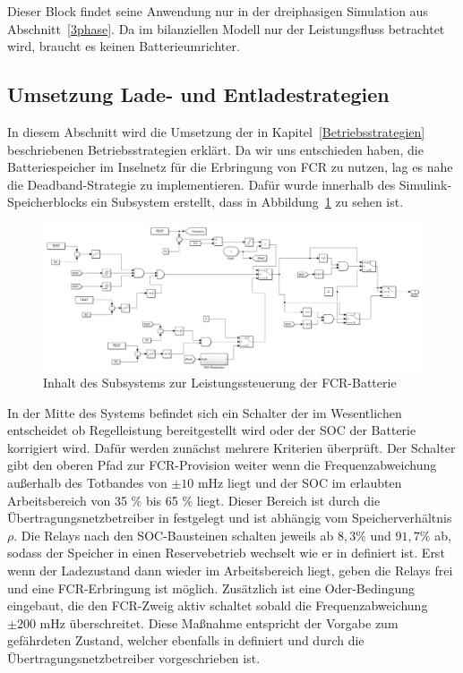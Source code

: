 Dieser Block findet seine Anwendung nur in der dreiphasigen Simulation aus Abschnitt~\ref{3phase}.
Da im bilanziellen Modell nur der Leistungsfluss betrachtet wird, braucht es keinen Batterieumrichter.

\subsection{Umsetzung Lade- und Entladestrategien}\label{Lade- und Entlade}
In diesem Abschnitt wird die Umsetzung der in Kapitel~\ref{Betriebsstrategien} beschriebenen Betriebsstrategien erklärt.
Da wir uns entschieden haben, die Batteriespeicher im Inselnetz für die Erbringung von FCR zu nutzen, lag es nahe 
die Deadband-Strategie zu implementieren.
Dafür wurde innerhalb des Simulink-Speicherblocks ein Subsystem erstellt, dass in Abbildung~\ref{Steuerung} zu sehen ist.

\begin{figure}[h!]
	\centering
	\includegraphics[width=14cm]{Abbildungen/Steuerung.png}
	\caption{Inhalt des Subsystems zur Leistungssteuerung der FCR-Batterie}\label{Steuerung}
\end{figure}

In der Mitte des Systems befindet sich ein Schalter der im Wesentlichen entscheidet ob Regelleistung bereitgestellt wird
oder der SOC der Batterie korrigiert wird.
Dafür werden zunächst mehrere Kriterien überprüft.
Der Schalter gibt den oberen Pfad zur FCR-Provision weiter wenn die Frequenzabweichung außerhalb des Totbandes von $\pm 10$ mHz liegt
und der SOC im erlaubten Arbeitsbereich von 35 \% bis 65 \% liegt.
Dieser Bereich ist durch die Übertragungsnetzbetreiber in \parencite[]{Reservebetrieb} festgelegt und ist abhängig vom Speicherverhältnis $\rho$.
Die Relays nach den SOC-Bausteinen schalten jeweils ab $8,3 \%$ und $91,7 \%$ ab, sodass der Speicher in einen Reservebetrieb wechselt wie er in \parencite[]{Reservebetrieb}
definiert ist.
Erst wenn der Ladezustand dann wieder im Arbeitsbereich liegt, geben die Relays frei und eine FCR-Erbringung ist möglich.
Zusätzlich ist eine Oder-Bedingung eingebaut, die den FCR-Zweig aktiv schaltet sobald die Frequenzabweichung $\pm 200$ mHz überschreitet.
Diese Maßnahme entspricht der Vorgabe zum gefährdeten Zustand, welcher ebenfalls in \parencite[]{Reservebetrieb} definiert 
und durch die Übertragungsnetzbetreiber vorgeschrieben ist.

